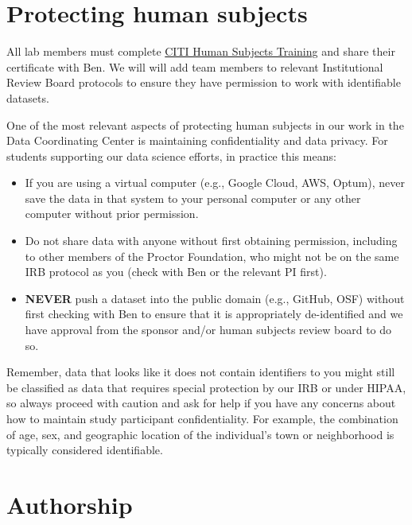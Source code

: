 \documentclass[]{book}
\providecommand{\tightlist}{%
  \setlength{\itemsep}{0pt}\setlength{\parskip}{0pt}}
\begin{document}
\hypertarget{protecting-human-subjects}{%
\section{Protecting human subjects}\label{protecting-human-subjects}}

All lab members must complete \href{https://irb.ucsf.edu/citi-human-subjects-training}{CITI Human Subjects Training} and share their certificate with Ben. We will will add team members to relevant Institutional Review Board protocols to ensure they have permission to work with identifiable datasets.

One of the most relevant aspects of protecting human subjects in our work in the Data Coordinating Center is maintaining confidentiality and data privacy. For students supporting our data science efforts, in practice this means:

\begin{itemize}
\tightlist
\item
  If you are using a virtual computer (e.g., Google Cloud, AWS, Optum), never save the data in that system to your personal computer or any other computer without prior permission.
\item
  Do not share data with anyone without first obtaining permission, including to other members of the Proctor Foundation, who might not be on the same IRB protocol as you (check with Ben or the relevant PI first).
\item
  \textbf{NEVER} push a dataset into the public domain (e.g., GitHub, OSF) without first checking with Ben to ensure that it is appropriately de-identified and we have approval from the sponsor and/or human subjects review board to do so.
\end{itemize}

Remember, data that looks like it does not contain identifiers to you might still be classified as data that requires special protection by our IRB or under HIPAA, so always proceed with caution and ask for help if you have any concerns about how to maintain study participant confidentiality. For example, the combination of age, sex, and geographic location of the individual's town or neighborhood is typically considered identifiable.

\hypertarget{authorship}{%
\section{Authorship}\label{authorship}}
\end{document}

